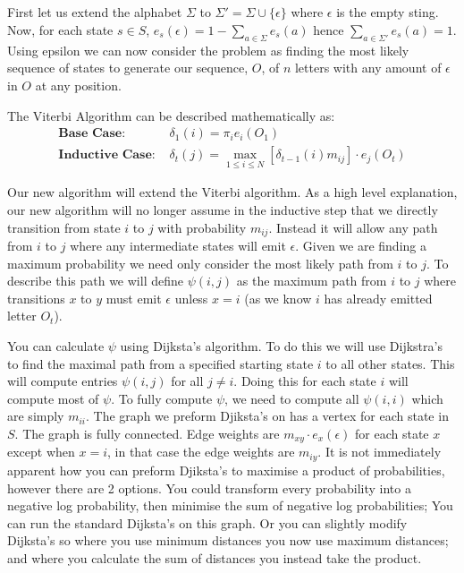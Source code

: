 \subsection{}
First let us extend the alphabet $\Sigma$ to $\Sigma' = \Sigma \cup \{\epsilon\}$ where $\epsilon$ is the empty sting. Now, for each state $s\in S$, $e_s(\epsilon) = 1 - \sum_{a\in \Sigma} e_s(a)$ hence $\sum_{a\in \Sigma'} e_s(a) = 1$. Using epsilon we can now consider the problem as finding the most likely sequence of states to generate our sequence, $O$, of $n$ letters with any amount of $\epsilon$ in $O$ at any position.

The Viterbi Algorithm can be described mathematically as:
\begin{align*}
\textbf{Base Case: } &\delta_1(i) = \pi_i e_i(O_1)\\
\textbf{Inductive Case: } &\delta_t(j) = \max_{1\leq i \leq N}[\delta_{t-1}(i)m_{ij}]\cdot e_j(O_t)
\end{align*}

Our new algorithm will extend the Viterbi algorithm. As a high level explanation, our new algorithm will no longer assume in the inductive step that we directly transition from state $i$ to $j$ with probability $m_{ij}$. Instead it will allow any path from $i$ to $j$ where any intermediate states will emit $\epsilon$. Given we are finding a maximum probability we need only consider the most likely path from $i$ to $j$. To describe this path we will define $\psi(i,j)$ as the maximum path from $i$ to $j$ where transitions $x$ to $y$ must emit $\epsilon$ unless $x=i$ (as we know $i$ has already emitted letter $O_t$).

You can calculate $\psi$ using Dijksta's algorithm. To do this we will use Dijkstra's to find the maximal path from a specified starting state $i$ to all other states. This will compute entries $\psi(i,j)$ for all $j\neq i$. Doing this for each state $i$ will compute most of $\psi$. To fully compute $\psi$, we need to compute all $\psi(i,i)$ which are simply $m_{ii}$.
The graph we preform Djiksta's on has a vertex for each state in $S$. The graph is fully connected. Edge weights are $m_{xy}\cdot e_x(\epsilon)$ for each state $x$ except when $x=i$, in that case the edge weights are $m_{iy}$. It is not immediately apparent how you can preform Djiksta's to maximise a product of probabilities, however there are 2 options. You could transform every probability into a negative log probability, then minimise the sum of negative log probabilities; You can run the standard Dijksta's on this graph. Or you can slightly modify Dijksta's so where you use minimum distances you now use maximum distances; and where you calculate the sum of distances you instead take the product.


